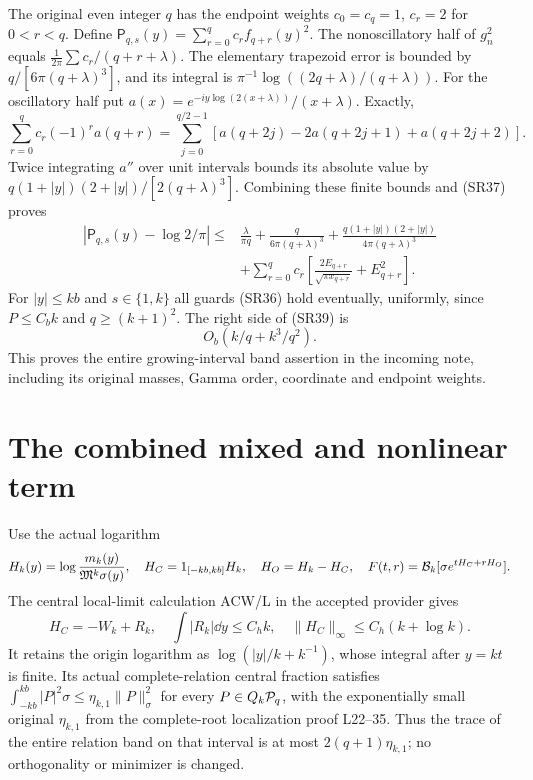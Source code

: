 The original even integer $q$ has the endpoint weights
$c_0=c_q=1$, $c_r=2$ for $0<r<q$. Define
$\mathsf P_{q,s}(y)=\sum_{r=0}^qc_rf_{q+r}(y)^2$.
The nonoscillatory half of $g_n^2$ equals
$\frac1{2\pi}\sum c_r/(q+r+\lambda)$.
The elementary trapezoid error is bounded by
$q/[6\pi(q+\lambda)^3]$, and its integral is
$\pi^{-1}\log((2q+\lambda)/(q+\lambda))$.
For the oscillatory half put
$a(x)=e^{-iy\log(2(x+\lambda))}/(x+\lambda)$.
Exactly,
\begin{equation}\tag{SR38}
 \sum_{r=0}^qc_r(-1)^ra(q+r)
 =\sum_{j=0}^{q/2-1}
 [a(q+2j)-2a(q+2j+1)+a(q+2j+2)].
\end{equation}
Twice integrating $a''$ over unit intervals bounds its absolute value by
$q(1+|y|)(2+|y|)/[2(q+\lambda)^3]$.
Combining these finite bounds and (SR37) proves
\begin{equation}\tag{SR39}\begin{aligned}
 |\mathsf P_{q,s}(y)-\log2/\pi|
 \le{}&\frac{\lambda}{\pi q}+
 \frac{q}{6\pi(q+\lambda)^3}
 +\frac{q(1+|y|)(2+|y|)}{4\pi(q+\lambda)^3}\\
 &+\sum_{r=0}^qc_r\left[
 \frac{2E_{q+r}}{\sqrt{\pi x_{q+r}}}+E_{q+r}^2\right].
\end{aligned}\end{equation}
For $|y|\le kb$ and $s\in\{1,k\}$ all guards (SR36) hold eventually,
uniformly, since $P\le C_bk$ and $q\ge(k+1)^2$. The right side of (SR39) is
\begin{equation}\tag{SR40}
 O_b(k/q+k^3/q^2).
\end{equation}
This proves the entire growing-interval band assertion in the incoming note,
including its original masses, Gamma order, coordinate and endpoint weights.

\section{The combined mixed and nonlinear term}
Use the actual logarithm
\[
 H_k(y)=\log\frac{m_k(y)}{\mathfrak M^k\sigma(y)},\quad
 H_C=1_{[-kb,kb]}H_k,\quad H_O=H_k-H_C,
 \quad F(t,r)=\mathcal B_k[\sigma e^{tH_C+rH_O}].
\]
The central local-limit calculation ACW/L in the accepted provider gives
\begin{equation}\tag{SR41}
 H_C=-W_k+R_k,\quad \int|R_k|\dd y\le C_hk,\quad
 \|H_C\|_\infty\le C_h(k+\log k).
\end{equation}
It retains the origin logarithm as $\log(|y|/k+k^{-1})$, whose integral after
$y=kt$ is finite. Its actual complete-relation central fraction satisfies
$\int_{-kb}^{kb}|P|^2\sigma\le\eta_{k,1}\|P\|_\sigma^2$
for every $P\in Q_k\mathcal P_q$, with the exponentially small original
$\eta_{k,1}$ from the complete-root localization proof L22--35.
Thus the trace of the entire relation band on that interval is at most
$2(q+1)\eta_{k,1}$; no orthogonality or minimizer is changed.

